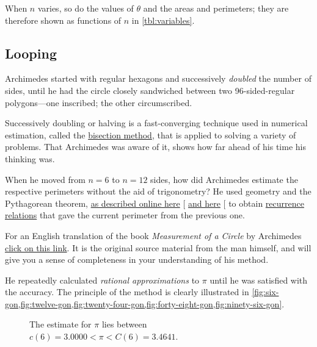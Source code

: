 \documentclass[
  a4paper,
]{article}
\begin{document}
\hfill\break

When \(n\) varies, so do the values of \(\theta\) and the areas and
perimeters; they are therefore shown as functions of \(n\) in
\cref{tbl:variables}.

\subsection{Looping}\label{looping}

Archimedes started with regular hexagons and successively \emph{doubled}
the number of sides, until he had the circle closely sandwiched between
two 96-sided-regular polygons---one inscribed; the other circumscribed.

Successively doubling or halving is a fast-converging technique used in
numerical estimation, called the
\href{https://en.wikipedia.org/wiki/Bisection_method}{bisection method},
that is applied to solving a variety of problems. That Archimedes was
aware of it, shows how far ahead of his time his thinking was.

When he moved from \(n=6\) to \(n = 12\) sides, how did Archimedes
estimate the respective perimeters without the aid of trigonometry? He
used geometry and the Pythagorean theorem,
\href{https://nonagon.org/ExLibris/archimedes-pi}{as described online
here} {[}\citeproc{ref-bertrand2014}{1}{]}
\href{https://publications.azimpremjiuniversity.edu.in/3356/1/02-DaminiAndAbhishek_PiIs22By7_Final.pdf}{and
here} {[}\citeproc{ref-damini-dhar-2020}{2}{]} to obtain
\href{https://en.wikipedia.org/wiki/Recurrence_relation}{recurrence
relations} that gave the current perimeter from the previous one.

For an English translation of the book \emph{Measurement of a Circle} by
Archimedes \href{auxiliary/Archimedes-Circle.pdf}{click on this link}.
It is the original source material from the man himself, and will give
you a sense of completeness in your understanding of his method.

He repeatedly calculated \emph{rational approximations} to \(\pi\) until
he was satisfied with the accuracy. The principle of the method is
clearly illustrated in
\cref{fig:six-gon,fig:twelve-gon,fig:twenty-four-gon,fig:forty-eight-gon,fig:ninety-six-gon}.

\begin{figure}
\centering

\caption{The estimate for \(\pi\) lies between
\(c(6) = 3.0000 < \pi < C(6) = 3.4641\).}\label{fig:six-gon}
\end{figure}
\end{document}
